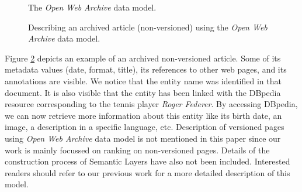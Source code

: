 \begin{figure}[H]
\centering
{}
\caption{The {\em Open Web Archive} data model.}
\label{fig:owa}
\end{figure}

\begin{figure}[H]
\centering
{}
\caption{Describing an archived article (non-versioned) using the {\em Open Web Archive} data model.}
\label{fig:owa_instNonVers}
\end{figure}

Figure \ref{fig:owa_instNonVers} depicts an example of an archived non-versioned article.
Some of its metadata values (date, format, title),
its references to other web pages, and its annotations are visible.
We notice that the entity name  was identified
in that document.
It is also visible that the entity has been linked with the DBpedia resource
corresponding to the tennis player {\em Roger Federer}.
By accessing DBpedia, we can now retrieve more information about this entity
like its birth date, an image, a description in a specific language, etc.
Description of versioned pages using {\em Open Web Archive}
data model is not mentioned in this paper since our
work is mainly focussed on ranking on non-versioned pages.
Details of the construction process of Semantic Layers
have also not been included.
Interested readers should refer to our previous work\cite{fafalios2017SemLayer}
for a more detailed description of this model.


